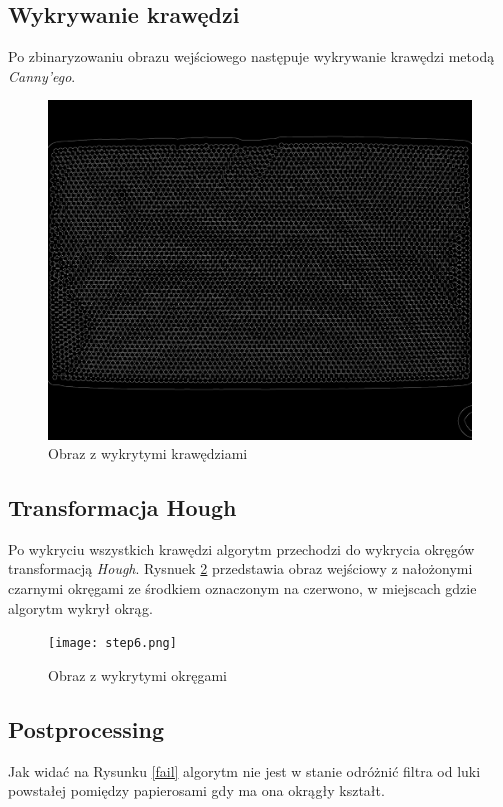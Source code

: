 \documentclass[12pt]{article}
\begin{document}
\subsection{Wykrywanie krawędzi}
Po zbinaryzowaniu obrazu wejściowego następuje wykrywanie krawędzi metodą \textit{Canny'ego}.

\begin{figure}[H]
\centering \includegraphics[scale=0.108]{step5.png}
\caption{Obraz z wykrytymi krawędziami}
\label{edges}
\end{figure}

\subsection{Transformacja Hough}
Po wykryciu wszystkich krawędzi algorytm przechodzi do wykrycia okręgów transformacją \textit{Hough}. Rysnuek \ref{circles} przedstawia obraz wejściowy z nałożonymi czarnymi okręgami ze środkiem oznaczonym na czerwono, w miejscach gdzie algorytm wykrył okrąg.

\begin{figure}[H]
\centering \texttt{[image: step6.png]}
\caption{Obraz z wykrytymi okręgami}
\label{circles}
\end{figure}

\subsection{Postprocessing}
Jak widać na Rysunku \ref{fail} algorytm nie jest w stanie odróżnić filtra od luki powstałej pomiędzy papierosami gdy ma ona okrągły kształt.
\end{document}
